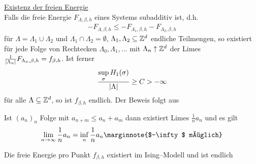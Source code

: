  \underline{Existenz der freien Energie} \\
 Falls die freie Energie $F_{\Lambda, \beta, h} $ eines Systems subadditiv ist, d.h. 
 \begin{align}
 	- F_{\Lambda, \beta, h} \leq -F_{\Lambda_1, \beta, h} - F_{\Lambda_2, \beta, h}
 \end{align}
 für $\Lambda = \Lambda_1 \cup \Lambda_2$ und $\Lambda_1 \cap \Lambda_2 = \emptyset$, $\Lambda_1, \Lambda_2 \subseteq \mathbb{Z}^d$ endliche Teilmengen, so existiert für jede Folge von Rechtecken $\Lambda_0, \Lambda_1, \dots$ mit $\Lambda_n \uparrow \mathbb{Z}^d$ der Limes $\frac{1}{\lvert\Lambda_n\rvert} F_{\Lambda_n, \beta, h} = f_{\beta,h}$. Ist ferner 
 \begin{align}
 	\frac{\sup\limits_{\sigma} H_1(\sigma) }{\lvert\Lambda\rvert} \geq C > - \infty
 \end{align}
 für alle $\Lambda \subseteq \mathbb{Z}^d$, so ist $f_{\beta,h}$ endlich. Der Beweis folgt aus
 \begin{lemma}
 	Ist $(a_n)_n$ Folge mit $a_{n+m} \leq a_n + a_m$ dann existiert Limes $\frac{1}{n} a_n$ und es gilt 
 	\begin{align}
 		\lim\limits_{n \to \infty} \frac{1}{n} a_n = \inf\limits_{n} \frac{1}{n} a_n \marginnote{$-\infty$ möglich}
 	\end{align}  	
 \end{lemma}
 \begin{korollar}
 Die freie Energie pro Punkt $f_{\beta,h}$ existiert im Ising--Modell und ist endlich	
 \end{korollar}
